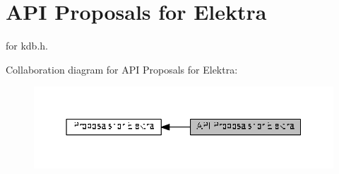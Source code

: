 \hypertarget{group__api}{}\section{A\+PI Proposals for Elektra}
\label{group__api}


for kdb.\+h.  


Collaboration diagram for A\+PI Proposals for Elektra\+:
\nopagebreak
\begin{figure}[H]
\begin{center}
\leavevmode
\includegraphics[width=350pt]{group__api}
\end{center}
\end{figure}
